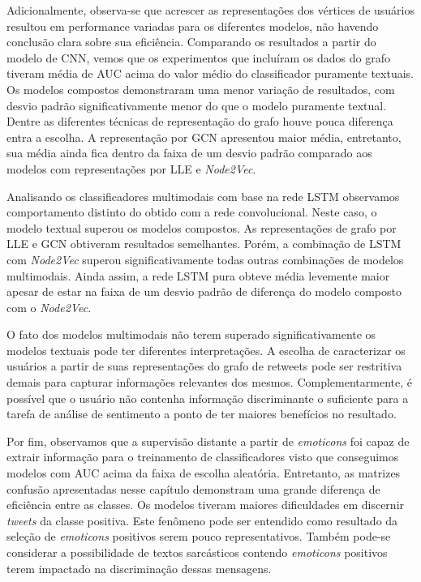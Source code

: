 Adicionalmente, observa-se que acrescer as representações dos vértices de
usuários resultou em performance variadas para os diferentes modelos, não
havendo conclusão clara sobre sua eficiência.
Comparando os resultados a partir do modelo de CNN, vemos que os experimentos
que incluíram os dados do grafo tiveram média de AUC acima do valor médio
do classificador puramente textuais.
Os modelos compostos demonstraram uma menor variação de resultados, com desvio
padrão significativamente menor do que o modelo puramente textual.
Dentre as diferentes técnicas de representação do grafo houve pouca diferença
entra a escolha.
A representação por GCN apresentou maior média, entretanto, sua média ainda fica
dentro da faixa de um desvio padrão comparado aos modelos com representações por
LLE e \textit{Node2Vec}.

Analisando os classificadores multimodais com base na rede LSTM observamos
comportamento distinto do obtido com a rede convolucional.
Neste caso, o modelo textual superou os modelos compostos.
As representações de grafo por LLE e GCN obtiveram resultados semelhantes.
Porém, a combinação de LSTM com \textit{Node2Vec} superou significativamente
todas outras combinações de modelos multimodais.
Ainda assim, a rede LSTM pura obteve média levemente maior apesar de estar na
faixa de um desvio padrão de diferença do modelo composto com o
\textit{Node2Vec}.

O fato dos modelos multimodais não terem superado significativamente os modelos
textuais pode ter diferentes interpretações.
A escolha de caracterizar os usuários a partir de suas representações do grafo
de retweets pode ser restritiva demais para capturar informações relevantes dos
mesmos.
Complementarmente, é possível que o usuário não contenha informação discriminante
o suficiente para a tarefa de análise de sentimento a ponto de ter maiores
benefícios no resultado.

Por fim, observamos que a supervisão distante a partir de \textit{emoticons} foi
capaz de extrair informação para o treinamento de classificadores visto que
conseguimos modelos com AUC acima da faixa de escolha aleatória.
Entretanto, as matrizes confusão apresentadas nesse capítulo demonstram uma
grande diferença de eficiência entre as classes.
Os modelos tiveram maiores dificuldades em discernir \textit{tweets} da classe
positiva.
Este fenômeno pode ser entendido como resultado da seleção de \textit{emoticons}
positivos serem pouco representativos.
Também pode-se considerar a possibilidade de textos sarcásticos contendo
\textit{emoticons} positivos terem impactado na discriminação dessas mensagens.


